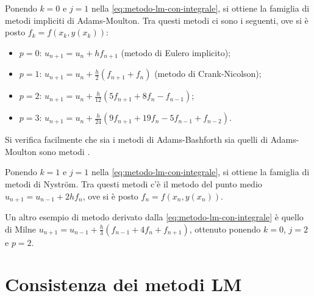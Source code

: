 	\begin{esempio}
		Ponendo \(k = 0\) e \(j = 1\) nella \eqref{eq:metodo-lm-con-integrale}, si ottiene la famiglia di metodi impliciti di Adams-Moulton. Tra questi metodi ci sono i seguenti, ove si è posto \(f_k = f (x_k, y (x_k))\):
		\begin{itemize}
			\item \(p = 0\): \(u_{n + 1} = u_n + h f_{n + 1}\) (metodo di Eulero implicito);
			\item \(p = 1\): \(u_{n + 1} = u_n + \frac{h}{2} (f_{n + 1} + f_n)\) (metodo di Crank-Nicolson);
			\item \(p = 2\): \(u_{n + 1} = u_n + \frac{h}{12} (5 f_{n + 1} + 8 f_n - f_{n - 1})\);
			\item \(p = 3\): \(u_{n + 1} = u_n + \frac{h}{24} (9 f_{n + 1} + 19 f_n - 5 f_{n - 1} + f_{n - 2})\).
		\end{itemize}
	\end{esempio}

	Si verifica facilmente che sia i metodi di Adams-Bashforth sia quelli di Adams-Moulton sono metodi .
	
	\begin{esempio}
		Ponendo \(k = 1\) e \(j = 1\) nella \eqref{eq:metodo-lm-con-integrale}, si ottiene la famiglia di metodi di Nyström. Tra questi metodi c'è il metodo del punto medio \(u_{n + 1} = u_{n - 1} + 2 h f_n\), ove si è posto \(f_n = f (x_n, y (x_n))\).
	\end{esempio}

	Un altro esempio di metodo derivato dalla \eqref{eq:metodo-lm-con-integrale} è quello di Milne \(u_{n + 1} = u_{n - 1} + \frac{h}{3} (f_{n - 1} + 4 f_n + f_{n + 1})\), ottenuto ponendo \(k = 0\), \(j = 2\) e \(p = 2\).
	
\section[Consistenza dei metodi \textsc{lm}]{Consistenza dei metodi LM}
	
